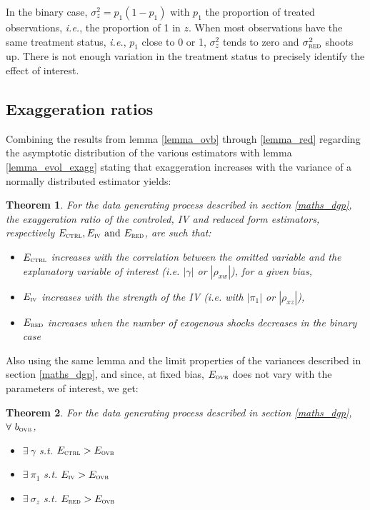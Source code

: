 \documentclass[usletter, 12pt]{article}
\newtheorem{theorem}{Theorem}
\begin{document}
				In the binary case, $\sigma_{z}^{2} = p_{1}(1-p_{1})$ with $p_{1}$ the proportion of treated observations, \textit{i.e.}, the proportion of 1 in $z$. When most observations have the same treatment status, \textit{i.e.}, $p_{1}$ close to 0 or 1, $\sigma_{z}^{2}$ tends to zero and $\sigma_{\textsc{red}}^{2}$ shoots up. There is not enough variation in the treatment status to precisely identify the effect of interest. 
				
		\subsection{Exaggeration ratios}
		
			Combining the results from lemma \ref{lemma_ovb} through \ref{lemma_red}  regarding the asymptotic distribution of the various estimators with lemma \ref{lemma_evol_exagg} stating that exaggeration increases with the variance of a normally distributed estimator yields:
			~
			\begin{theorem}
				For the data generating process described in section \ref{maths_dgp}, the exaggeration ratio of the controled, IV and reduced form estimators, respectively $E_{\textsc{ctrl}}, E_{\textsc{iv}} \text{ and } E_{\textsc{red}}$, are such that:
					\begin{itemize}
						\item $E_{\textsc{ctrl}}$ increases with the correlation between the omitted variable and the explanatory variable of interest (\textit{i.e.} $|\gamma|$ or $|\rho_{xw}|$), for a given bias,
						\item $E_{\textsc{iv}}$ increases with the strength of the IV (\textit{i.e.} with $|\pi_{1}|$ or $|\rho_{xz}|$),
						\item $E_{\textsc{red}}$ increases when the number of exogenous shocks decreases in the binary case
					\end{itemize}
			\end{theorem}
			
			Also using the same lemma and the limit properties of the variances described in section \ref{maths_dgp}, and since, at fixed bias, $E_{\textsc{ovb}}$ does not vary with the parameters of interest, we get:
			~
			\begin{theorem}
				For the data generating process described in section \ref{maths_dgp}, $\forall \ b_{\textsc{ovb}}$,
					\begin{itemize}
						\item $\exists \ \gamma$ s.t. $E_{\textsc{ctrl}} > E_{\textsc{ovb}}$
						\item $\exists \ \pi_{1}$ s.t. $E_{\textsc{iv}} > E_{\textsc{ovb}}$
						\item $\exists \ \sigma_{z}$ s.t. $E_{\textsc{red}} > E_{\textsc{ovb}}$
					\end{itemize}
			\end{theorem}
			
\end{document}
